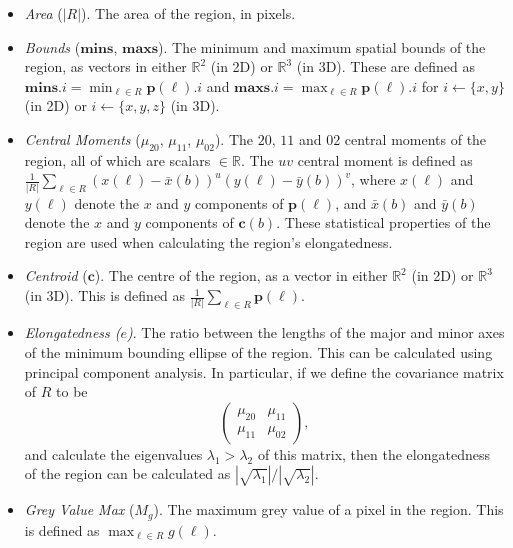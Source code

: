 \begin{itemize}

\item \emph{Area} ($|R|$). The area of the region, in pixels.

\item \emph{Bounds} ($\mathbf{mins}$, $\mathbf{maxs}$). The minimum and maximum spatial bounds of the region, as vectors in either $\mathbb{R}^2$ (in 2D) or $\mathbb{R}^3$ (in 3D). These are defined as $\mathbf{mins}.i = \min_{\ell \in R} \mathbf{p}(\ell).i$ and $\mathbf{maxs}.i = \max_{\ell \in R} \mathbf{p}(\ell).i$ for $i \leftarrow \{x,y\}$ (in 2D) or $i \leftarrow \{x,y,z\}$ (in 3D).

\item \emph{Central Moments} ($\mu_{20}$, $\mu_{11}$, $\mu_{02}$). The $20$, $11$ and $02$ central moments of the region, all of which are scalars $\in \mathbb{R}$. The $uv$ central moment is defined as $\displaystyle \frac{1}{|R|} \sum_{\ell \in R} (x(\ell) - \bar{x}(b))^u (y(\ell) - \bar{y}(b))^v$, where $x(\ell)$ and $y(\ell)$ denote the $x$ and $y$ components of $\mathbf{p}(\ell)$, and $\bar{x}(b)$ and $\bar{y}(b)$ denote the $x$ and $y$ components of $\mathbf{c}(b)$. These statistical properties of the region are used when calculating the region's elongatedness.

\item \emph{Centroid} ($\mathbf{c}$). The centre of the region, as a vector in either $\mathbb{R}^2$ (in 2D) or $\mathbb{R}^3$ (in 3D). This is defined as $\displaystyle \frac{1}{|R|} \sum_{\ell \in R} \mathbf{p}(\ell)$.

\item \emph{Elongatedness ($e$)}. The ratio between the lengths of the major and minor axes of the minimum bounding ellipse of the region. This can be calculated using principal component analysis. In particular, if we define the covariance matrix of $R$ to be
%
\[
\left(
\begin{array}{cc}
\mu_{20} & \mu_{11} \\
\mu_{11} & \mu_{02}
\end{array}
\right),
\]
%
and calculate the eigenvalues $\lambda_1 > \lambda_2$ of this matrix, then the elongatedness of the region can be calculated as $|\sqrt{\lambda_1}| / |\sqrt{\lambda_2}|$.

\item \emph{Grey Value Max} ($M_g$). The maximum grey value of a pixel in the region. This is defined as $\displaystyle \max_{\ell \in R} g(\ell)$.


\end{itemize}
